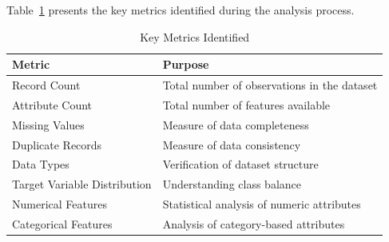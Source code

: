\documentclass[12pt,a4paper]{report}
\begin{document}
Table~\ref{tab:key_metrics} presents the key metrics identified during the analysis process.
\begin{table}[H]
\centering
\caption{Key Metrics Identified}
\label{tab:key_metrics}

\begin{tabular}{|p{5cm}|p{6cm}|}
\hline
\textbf{Metric} & \textbf{Purpose} \\
\hline
Record Count & Total number of observations in the dataset \\
\hline
Attribute Count & Total number of features available \\
\hline
Missing Values & Measure of data completeness \\
\hline
Duplicate Records & Measure of data consistency \\
\hline
Data Types & Verification of dataset structure \\
\hline
Target Variable Distribution & Understanding class balance \\
\hline
Numerical Features & Statistical analysis of numeric attributes \\
\hline
Categorical Features & Analysis of category-based attributes \\
\hline
\end{tabular}

\end{table}
\end{document}
